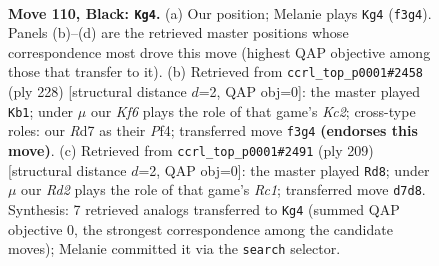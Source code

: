 \documentclass[11pt]{article}
\begin{document}
\clearpage

\begin{figure}[p]\centering
\begin{subfigure}{0.46\textwidth}\centering
\resizebox{\linewidth}{!}{%
\newchessgame
\chessboard[
  setfen={8/3r4/7K/8/8/5k2/8/8 b - - 5 110},
  showmover=false,
  pgfstyle=straightmove, color=movearrow, markmove={f3-g4}
]}
\caption{}
\end{subfigure}\hfill
\begin{subfigure}{0.46\textwidth}\centering
\resizebox{\linewidth}{!}{%
\newchessgame
\chessboard[
  setfen={8/8/8/2k5/5P2/8/2K5/8 w - - 0 115},
  showmover=false,
  pgfstyle=straightmove, color=movearrow, markmove={c2-b1}
]}
\caption{}
\end{subfigure}
\\[4pt]
\begin{subfigure}{0.46\textwidth}\centering
\resizebox{\linewidth}{!}{%
\newchessgame
\chessboard[
  setfen={2r5/4k3/8/8/K7/8/3N4/8 b - - 5 105},
  showmover=false,
  pgfstyle=straightmove, color=movearrow, markmove={c8-d8}
]}
\caption{}
\end{subfigure}\hfill

\caption{\textbf{Move 110, Black: \texttt{Kg4}.} (a) Our position; Melanie plays \texttt{Kg4} (\texttt{f3g4}). Panels (b)--(d) are the retrieved master positions whose correspondence most drove this move (highest QAP objective among those that transfer to it). (b) Retrieved from \texttt{ccrl\_top\_p0001\#2458} (ply 228) [structural distance $d$=2, QAP obj=0]: the master played \texttt{Kb1}; under $\mu$ our \emph{Kf6} plays the role of that game's \emph{Kc2}; cross-type roles: our \emph{R}d7 as their \emph{P}f4; transferred move \texttt{f3g4} \textbf{(endorses this move)}. (c) Retrieved from \texttt{ccrl\_top\_p0001\#2491} (ply 209) [structural distance $d$=2, QAP obj=0]: the master played \texttt{Rd8}; under $\mu$ our \emph{Rd2} plays the role of that game's \emph{Rc1}; transferred move \texttt{d7d8}. Synthesis: 7 retrieved analogs transferred to \texttt{Kg4} (summed QAP objective 0, the strongest correspondence among the candidate moves); Melanie committed it via the \texttt{search} selector.}
\label{fig:thought-m219}
\end{figure}

\clearpage
\end{document}
